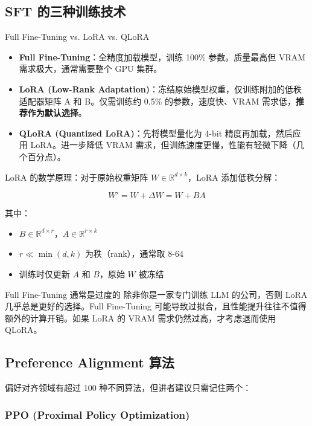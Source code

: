 \documentclass[a4paper]{article}
\begin{document}
\subsection{SFT 的三种训练技术}

\begin{importantbox}{Full Fine-Tuning vs. LoRA vs. QLoRA}
\begin{itemize}
    \item \textbf{Full Fine-Tuning}：全精度加载模型，训练 100\% 参数。质量最高但 VRAM 需求极大，通常需要整个 GPU 集群。
    \item \textbf{LoRA (Low-Rank Adaptation)}：冻结原始模型权重，仅训练附加的低秩适配器矩阵 A 和 B。仅需训练约 0.5\% 的参数，速度快、VRAM 需求低，\textbf{推荐作为默认选择}。
    \item \textbf{QLoRA (Quantized LoRA)}：先将模型量化为 4-bit 精度再加载，然后应用 LoRA。进一步降低 VRAM 需求，但训练速度更慢，性能有轻微下降（几个百分点）。
\end{itemize}
\end{importantbox}

LoRA 的数学原理：对于原始权重矩阵 $W \in \mathbb{R}^{d \times k}$，LoRA 添加低秩分解：

$$W' = W + \Delta W = W + BA$$

其中：
\begin{itemize}
    \item $B \in \mathbb{R}^{d \times r}$，$A \in \mathbb{R}^{r \times k}$
    \item $r \ll \min(d, k)$ 为秩（rank），通常取 8-64
    \item 训练时仅更新 $A$ 和 $B$，原始 $W$ 被冻结
\end{itemize}

\begin{warningbox}{Full Fine-Tuning 通常是过度的}
除非你是一家专门训练 LLM 的公司，否则 LoRA 几乎总是更好的选择。Full Fine-Tuning 可能导致过拟合，且性能提升往往不值得额外的计算开销。如果 LoRA 的 VRAM 需求仍然过高，才考虑退而使用 QLoRA。
\end{warningbox}

\subsection{Preference Alignment 算法}

偏好对齐领域有超过 100 种不同算法，但讲者建议只需记住两个：

\subsubsection{PPO (Proximal Policy Optimization)}
\end{document}
